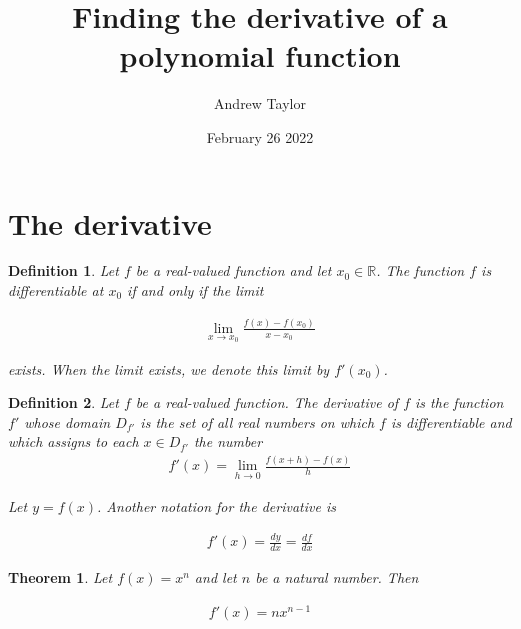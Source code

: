 \documentclass{article}
\title{Finding the derivative of a polynomial function}
\author{Andrew Taylor}
\date{February 26 2022}
\newtheorem{definition}{Definition}
\newtheorem{theorem}{Theorem}
\begin{document}
\maketitle
\section{The derivative}

\begin{definition}
Let $f$ be a real-valued function and let $x_{0} \in \mathbb{R}$. The function $f$ is differentiable at $x_{0}$ if and only if the limit

\begin{align*}
\lim_{x \to x_{0}} \frac{f(x) - f(x_{0})}{x - x_{0}}
\end{align*}

exists. When the limit exists, we denote this limit by $f'(x_{0})$.
\end{definition}

\begin{definition}
Let $f$ be a real-valued function. The derivative of $f$ is the function $f'$ whose domain $D_{f'}$ is the set of all real numbers on which $f$ is differentiable and which assigns to each $x \in D_{f'}$ the number
\begin{align*}
f'(x) = \lim_{h \to 0} \frac{f(x+h) - f(x)}{h}
\end{align*}

Let $y = f(x)$. Another notation for the derivative is

\begin{align*}
f'(x) = \frac{dy}{dx} = \frac{df}{dx}
\end{align*}
\end{definition}

\begin{theorem}
Let $f(x) = x^{n}$ and let $n$ be a natural number. Then

\begin{align*}
f'(x) = nx^{n-1}
\end{align*}
\end{theorem}
\end{document}
